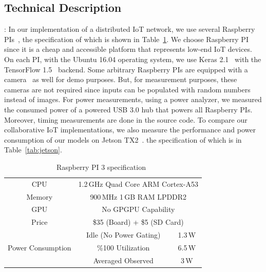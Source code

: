 \documentclass[sigplan]{acmart}
\begin{document}
\subsection{Technical Description}
%
%
%
: 
In our implementation of a distributed IoT network, we use several Raspberry PIs~\cite{pi3}, the specification of which is shown in Table~\ref{tab:pi}. We choose Raspberry PI since it is a cheap and accessible platform that represents low-end IoT devices. On each PI, with the Ubuntu 16.04 operating system, we use Keras 2.1~\cite{chollet2015keras} with the TensorFlow 1.5~\cite{tensorflow2015-whitepaper} backend. Some arbitrary Raspberry PIs are equipped with a camera~\cite{pi3-cam} as well for demo purposes. But, for measurement purposes, these cameras are not required since inputs can be populated with random numbers instead of images. For power measurements, using a power analyzer, we measured the consumed power of a powered USB 3.0 hub that powers all Raspberry PIs. Moreover, timing measurements are done in the source code. To compare our collaborative IoT implementations, we also measure the performance and power consumption of our models on Jetson TX2~\cite{jetson}. the specification of which is in Table~\ref{tab:jetson}.


\renewcommand{\arraystretch}{0.7}
\begin{table}[t]
    \small
	\centering
	\vspace{-10pt}
	\captionsetup{singlelinecheck=on,aboveskip=1pt}
	\caption{Raspberry PI 3 specification~\cite{pi3}}
	\begin{tabular}{c | c | c}
		\toprule
        CPU & \multicolumn{2}{c}{1.2\,GHz Quad Core ARM Cortex-A53} \\
        Memory &  \multicolumn{2}{c}{900\,MHz 1\,GB RAM LPDDR2} \\
        GPU & \multicolumn{2}{c}{No GPGPU Capability} \\
        Price & \multicolumn{2}{c}{\$35 (Board) + \$5 (SD Card)} \\
        \midrule
        \multirow{3}{2cm}{\centering Power Consumption }
        &Idle (No Power Gating) & 1.3\,W \\
        &\%100 Utilization & 6.5\,W \\
        & Averaged Observed & 3\,W \\
		\bottomrule
	\end{tabular}
	\label{tab:pi}
	\vspace{-10pt}
\end{table} \renewcommand{\arraystretch}{1}
\end{document}
